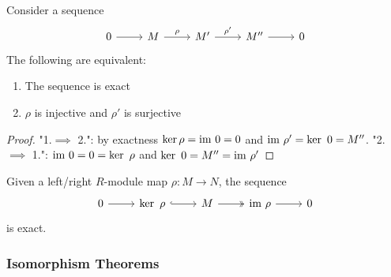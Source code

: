     \begin{lemma}\label{ExactnessIsEquivalentToInjFirstSESSurjSecondSES}
        Consider a sequence 
        $$\begin{tikzcd}
            0 \arrow[r] &M \arrow[r,"\rho"] & M' \arrow[r,"\rho'"] & M'' \arrow[r] & 0
        \end{tikzcd}$$
        The following are equivalent:
        \begin{enumerate}
            \item The sequence is exact
            \item $\rho $ is injective and $\rho'$ is surjective 
        \end{enumerate}
    \end{lemma}
    \begin{proof}
        "1.$\implies$ 2.": by exactness $\ker \rho = \mathrm{im}\ 0 = 0$ and $\mathrm{im}\ \rho' =\ker \ 0 = M''$.
        "2.$\implies$ 1.": $\mathrm{im} \ 0 = 0 = \ker \ \rho $ and $\ker \ 0 = M'' = \mathrm{im}\ \rho'$ \end{proof}
    \begin{corollary}
        Given a left/right $R$-module map $\rho : M \rightarrow N$, the sequence
        $$\begin{tikzcd}
            0 \arrow[r] & \ker \ \rho \arrow[hookrightarrow,r] & M \arrow[twoheadrightarrow, r] & \im \ \rho \arrow[r] &0 
        \end{tikzcd}$$
        is exact.
    \end{corollary}
    \subsubsection{Isomorphism Theorems}
      
